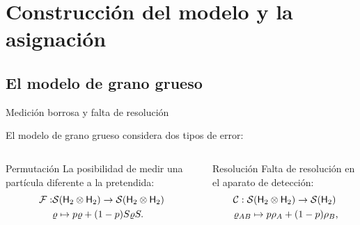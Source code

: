 \section{Construcción del modelo y la asignación}

\subsection{El modelo de grano grueso}
\begin{frame}{Medición borrosa y falta de resolución}
    \begin{center}
        El modelo de grano grueso considera dos tipos de error\pause:
    \end{center}
    \vspace{0.3cm}
    \begin{columns}
        \begin{column}{0.5\textwidth}
            \begin{block}{Permutación}
            \centering
            La posibilidad de medir una partícula diferente a la pretendida\pause:
            \begin{align}
                \mathcal{F}:&\mathcal{S}({\sf H}_2 \otimes {\sf H}_2)\to \mathcal{S}({\sf H}_2 \otimes {\sf H}_2)\nonumber\\
                &\varrho \mapsto p\varrho+(1-p)S\varrho S.\nonumber
            \end{align}
        \end{block}
        \end{column}
        \pause
        \begin{column}{0.5\textwidth}
            \begin{block}{Resolución}
            \centering
            Falta de resolución en el aparato de detección\pause:
            \begin{gather}
                \mcC:\mcS(\hilbert_2 \otimes \hilbert_2)\to \mcS(\hilbert_2)\nonumber\\
                \varrho_{AB} \mapsto p\rho_A+(1-p)\rho_B\rlap{,}\nonumber
            \end{gather}
        \end{block}
        \end{column}
    \end{columns}
\end{frame}
